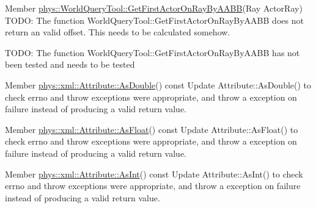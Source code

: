 \label{dd/da0/todo__todo000038}
\hypertarget{dd/da0/todo__todo000038}{}
 
\begin{DoxyDescription}
\item[Member \hyperlink{classphys_1_1WorldQueryTool_a67575416c2e9c652bbd873649ee38baf}{phys::WorldQueryTool::GetFirstActorOnRayByAABB}(Ray ActorRay) ]TODO: The function WorldQueryTool::GetFirstActorOnRayByAABB does not return an valid offset. This needs to be calculated somehow. 

TODO: The function WorldQueryTool::GetFirstActorOnRayByAABB has not been tested and needs to be tested 
\end{DoxyDescription}

\label{dd/da0/todo__todo000048}
\hypertarget{dd/da0/todo__todo000048}{}
 
\begin{DoxyDescription}
\item[Member \hyperlink{classphys_1_1xml_1_1Attribute_a467ae167d5407ae3293a22b8873cb43a}{phys::xml::Attribute::AsDouble}() const  ]Update Attribute::AsDouble() to check errno and throw exceptions were appropriate, and throw a exception on failure instead of producing a valid return value. 
\end{DoxyDescription}

\label{dd/da0/todo__todo000049}
\hypertarget{dd/da0/todo__todo000049}{}
 
\begin{DoxyDescription}
\item[Member \hyperlink{classphys_1_1xml_1_1Attribute_aad74f805b9318735011d698ee39113aa}{phys::xml::Attribute::AsFloat}() const  ]Update Attribute::AsFloat() to check errno and throw exceptions were appropriate, and throw a exception on failure instead of producing a valid return value. 
\end{DoxyDescription}

\label{dd/da0/todo__todo000046}
\hypertarget{dd/da0/todo__todo000046}{}
 
\begin{DoxyDescription}
\item[Member \hyperlink{classphys_1_1xml_1_1Attribute_ada1f2e45ce636ad8482972263364e7fa}{phys::xml::Attribute::AsInt}() const  ]Update Attribute::AsInt() to check errno and throw exceptions were appropriate, and throw a exception on failure instead of producing a valid return value. 
\end{DoxyDescription}

\label{dd/da0/todo__todo000047}
\hypertarget{dd/da0/todo__todo000047}{}
 
